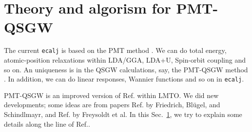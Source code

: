 \documentclass[a4paper,10pt,epsf,fleqn]{article}
\begin{document}


\newpage
\section{Theory and algorism for PMT-QSGW}
\label{sec:theory}
The current {\tt ecalj} is based on the PMT method
\cite{kotani2015pmt,kotani_linearized_2013,pmt1}.
We can do total energy, 
atomic-position relaxations within LDA/GGA, LDA+U, 
Spin-orbit coupling and so on.
An uniqueness is in the QSGW calculations, say, the PMT-QSGW method
\cite{kotani_quasiparticle_2014}. 
In addition, we can do linear responses, Wannier functions and 
so on in {\tt ecalj}.

PMT-QSGW is an improved version of 
Ref.\cite{kotani_quasiparticle_2007} within LMTO.
We did new developments; some ideas are from papers
Ref.\cite{friedrich_efficient_2010} 
by Friedrich, Bl\"ugel, and Schindlmayr,
and Ref.\cite{Freysoldt2007} by Freysoldt et al.
In this Sec.~\ref{sec:theory}, we try to explain some details along
the line of Ref.\cite{kotani_quasiparticle_2014,}.
\end{document}
